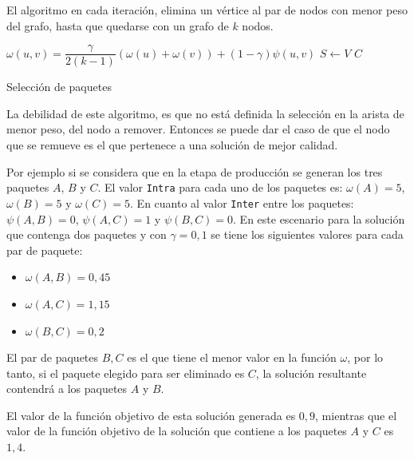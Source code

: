El algoritmo en cada iteración, elimina un vértice al par de nodos con menor peso del grafo, hasta que quedarse con un grafo de $k$ nodos.

\begin{center}
	\begin{algorithm}[H]
	\DontPrintSemicolon
	\SetAlgoLined
		$\omega(u,v) = \dfrac{\gamma}{2( k - 1)} (\omega(u) + \omega(v)) + (1 - \gamma)\psi(u,v)$\;
		$S \leftarrow V$\;
		\Return $C$\;
	\caption{Selección de paquetes}\label{alg:chooseBundles}
	\end{algorithm}
\end{center}


La debilidad de este algoritmo, es que no está definida la selección en la arista de menor peso, del nodo a remover. Entonces se puede dar el caso de que el nodo que se remueve es el que pertenece a una solución de mejor calidad.

Por ejemplo si se considera que en la etapa de producción se generan los tres paquetes $A$, $B$ y $C$. El valor \texttt{Intra} para cada uno de los paquetes es: $\omega(A) = 5$, $\omega(B) = 5$ y $\omega(C) = 5$. En cuanto al valor \texttt{Inter} entre los paquetes: $\psi(A,B) = 0$, $\psi(A,C) = 1$ y $\psi(B,C) = 0$. En este escenario para la solución que contenga dos paquetes y con $\gamma=0,1$ se tiene los siguientes valores para cada par de paquete:
\begin{itemize}
	\item $\omega(A,B) = 0,45$
	\item $\omega(A,C) = 1,15$
	\item $\omega(B,C) = 0,2$
\end{itemize}
 
El par de paquetes $B, C$ es el que tiene el menor valor en la función $\omega$, por lo tanto, si el paquete elegido para ser eliminado es $C$, la solución resultante contendrá a los paquetes $A$ y $B$. 

El valor de la función objetivo de esta solución generada es $0,9$, mientras que el valor de la función objetivo de la solución que contiene a los paquetes $A$ y $C$ es $1,4$.

